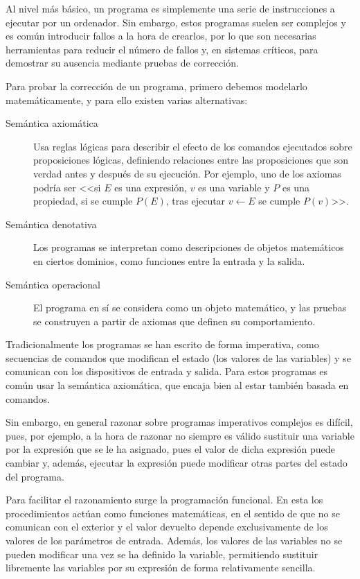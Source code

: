 Al nivel más básico, un programa es simplemente una serie de instrucciones a
ejecutar por un ordenador. Sin embargo, estos programas suelen ser complejos y
es común introducir fallos a la hora de crearlos, por lo que son necesarias
herramientas para reducir el número de fallos y, en sistemas críticos, para
demostrar su ausencia mediante pruebas de corrección.

Para probar la corrección de un programa, primero debemos modelarlo
matemáticamente, y para ello existen varias alternativas:

\begin{description}
\item[Semántica axiomática] Usa reglas lógicas para describir el efecto de los
  comandos ejecutados sobre proposiciones lógicas, definiendo relaciones entre
  las proposiciones que son verdad antes y después de su ejecución. Por ejemplo,
  uno de los axiomas podría ser <<si $E$ es una expresión, $v$ es una variable y
  $P$ es una propiedad, si se cumple $P(E)$, tras ejecutar $v\gets E$ se cumple
  $P(v)$>>.
\item[Semántica denotativa] Los programas se interpretan como descripciones de
  objetos matemáticos en ciertos dominios, como funciones entre la entrada y la
  salida.
\item[Semántica operacional] El programa en sí se considera como un objeto
  matemático, y las pruebas se construyen a partir de axiomas que definen su
  comportamiento.
\end{description}

Tradicionalmente los programas se han escrito de forma imperativa, como
secuencias de comandos que modifican el estado (los valores de las variables) y
se comunican con los dispositivos de entrada y salida. Para estos programas es
común usar la semántica axiomática, que encaja bien al estar también basada en
comandos.

Sin embargo, en general razonar sobre programas imperativos complejos es
difícil, pues, por ejemplo, a la hora de razonar no siempre es válido sustituir
una variable por la expresión que se le ha asignado, pues el valor de dicha
expresión puede cambiar y, además, ejecutar la expresión puede modificar otras
partes del estado del programa.

Para facilitar el razonamiento surge la programación funcional. En esta los
procedimientos actúan como funciones matemáticas, en el sentido de que no se
comunican con el exterior y el valor devuelto depende exclusivamente de los
valores de los parámetros de entrada. Además, los valores de las variables no se
pueden modificar una vez se ha definido la variable, permitiendo sustituir
libremente las variables por su expresión de forma relativamente sencilla.

